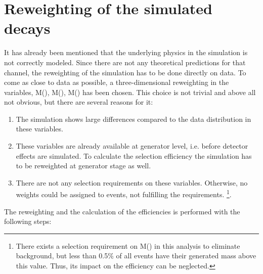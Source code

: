 \section{Reweighting of the simulated \LbToDpmunuX decays}
\label{sec:Reweight_D0p}
It has already been mentioned that the underlying physics in the \LbToDpmunuX simulation is not correctly modeled.
Since there are not any theoretical predictions for that channel, the reweighting of the simulation has to be done directly on data.
To come as close to data as possible, a three-dimensional reweighting in the variables, M(\Dz\proton), M(\Dz\mun), M(\Dz\proton\mun) has been chosen. 
This choice is not trivial and above all not obvious, but there are several reasons for it:
\begin{enumerate}
    \item The simulation shows large differences compared to the data distribution in these variables.
    \item These variables are already available at generator level, i.e. before detector effects are simulated. 
          To calculate the selection efficiency the simulation has to be reweighted at generator stage as well.
    \item There are not any selection requirements on these variables. 
          Otherwise, no weights could be assigned to events, not fulfilling the requirements.
          \footnote{There exists a selection requirement on M(\Dz\proton\mun) in this analysis to eliminate \decay{\Lb}{\Dz\proton\pim} background, but less than 0.5\% of all events have their generated mass above this value. 
                    Thus, its impact on the efficiency can be neglected.}.
\end{enumerate}
The reweighting and the calculation of the efficiencies is performed with the following steps:
